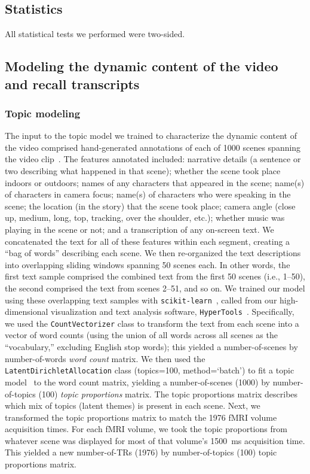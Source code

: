 \documentclass{article}
\begin{document}
\subsection*{Statistics}
All statistical tests we performed were two-sided.

\subsection*{Modeling the dynamic content of the video and recall transcripts}
\subsubsection*{Topic modeling}
The input to the topic model we trained to characterize the dynamic content of the video comprised hand-generated annotations of each of 1000 scenes spanning the video clip~\citep[generated by][]{ChenEtal17}.  The features annotated included: narrative details (a sentence or two describing what happened in that scene); whether the scene took place indoors or outdoors; names of any characters that appeared in the scene; name(s) of characters in camera focus; name(s) of characters who were speaking in the scene; the location (in the story) that the scene took place; camera angle (close up, medium, long, top, tracking, over the shoulder, etc.); whether music was playing in the scene or not; and a transcription of any on-screen text.  We concatenated the text for all of these features within each segment, creating a ``bag of words'' describing each scene.  We then re-organized the text descriptions into overlapping sliding windows spanning 50 scenes each. In other words, the first text sample comprised the combined text from the first 50 scenes (i.e., 1--50), the second comprised the text from scenes 2--51, and so on.  We trained our model using these overlapping text samples with \texttt{scikit-learn}~\citep[version 0.19.1; ][]{PedrEtal11}, called from our high-dimensional visualization and text analysis software, \texttt{HyperTools}~\citep{HeusEtal18a}.  Specifically, we used the \texttt{CountVectorizer} class to transform the text from each scene into a vector of word counts (using the union of all words across all scenes as the ``vocabulary,'' excluding English stop words); this yielded a number-of-scenes by number-of-words \textit{word count} matrix.  We then used the \texttt{LatentDirichletAllocation} class (topics=100, method=`batch') to fit a topic model~\citep{BleiEtal03} to the word count matrix, yielding a number-of-scenes (1000) by number-of-topics (100) \textit{topic proportions} matrix.  The topic proportions matrix describes which mix of topics (latent themes) is present in each scene.  Next, we transformed the topic proportions matrix to match the 1976 fMRI volume acquisition times.  For each fMRI volume, we took the topic proportions from whatever scene was displayed for most of that volume's 1500~ms acquisition time.  This yielded a new number-of-TRs (1976) by number-of-topics (100) topic proportions matrix.
\end{document}
